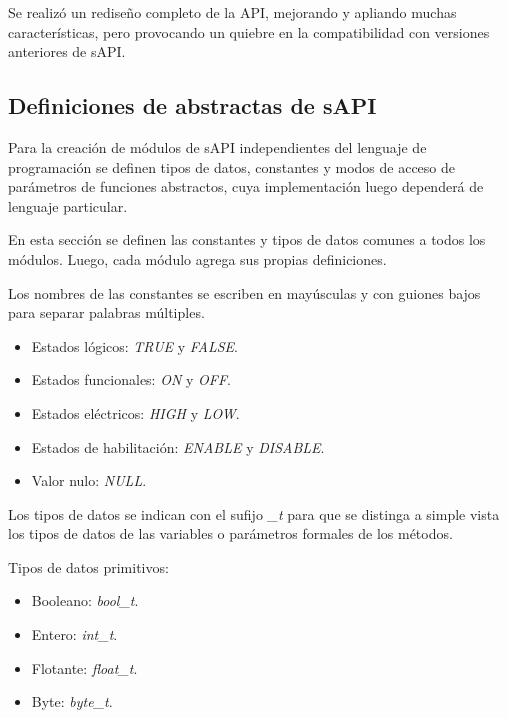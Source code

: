 Se realizó un rediseño completo de la API, mejorando y apliando muchas características, pero provocando un quiebre en la compatibilidad con versiones anteriores de sAPI.

\subsection{Definiciones de abstractas de sAPI}

Para la creación de módulos de sAPI independientes del lenguaje de programación se definen tipos de datos, constantes y modos de acceso de parámetros de funciones abstractos, cuya implementación luego dependerá de lenguaje particular. 

En esta sección se definen las constantes y tipos de datos comunes a todos los módulos. Luego, cada módulo agrega sus propias definiciones.


Los nombres de las constantes se escriben en mayúsculas y con guiones bajos para separar palabras múltiples. 

\begin{itemize}
\item
Estados lógicos: \emph{TRUE} y \emph{FALSE}.
\item
Estados funcionales: \emph{ON} y \emph{OFF}.
\item
Estados eléctricos: \emph{HIGH} y \emph{LOW}.
\item
Estados de habilitación: \emph{ENABLE} y \emph{DISABLE}.
\item
Valor nulo: \emph{NULL}.
\end{itemize}


Los tipos de datos se indican con el sufijo \emph{\_t} para que se distinga a simple vista los tipos de datos de las variables o parámetros formales de los métodos.

Tipos de datos primitivos:

\begin{itemize}
\item
Booleano: \emph{bool\_t}. 
\item
Entero: \emph{int\_t}.
\item
Flotante: \emph{float\_t}.
\item
Byte: \emph{byte\_t}.
\end{itemize}

